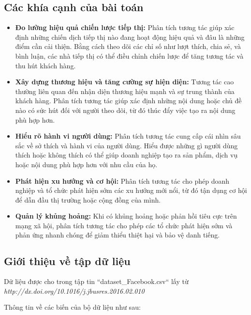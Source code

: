 \subsection*{Các khía cạnh của bài toán}
\begin{itemize}
    \item \textbf{Đo lường hiệu quả chiến lược tiếp thị:} 
    Phân tích tương tác giúp xác định những chiến dịch tiếp thị nào đang hoạt động hiệu quả và đâu là những điểm cần cải thiện. Bằng cách theo dõi các chỉ số như lượt thích, chia sẻ, và bình luận, các nhà tiếp thị có thể điều chỉnh chiến lược để tăng tương tác và thu hút khách hàng.

    \item \textbf{Xây dựng thương hiệu và tăng cường sự hiện diện:} 
    Tương tác cao thường liên quan đến nhận diện thương hiệu mạnh và sự trung thành của khách hàng. Phân tích tương tác giúp xác định những nội dung hoặc chủ đề nào có sức hút đối với người theo dõi, từ đó thúc đẩy việc tạo ra nội dung phù hợp hơn.

    \item \textbf{Hiểu rõ hành vi người dùng:} 
    Phân tích tương tác cung cấp cái nhìn sâu sắc về sở thích và hành vi của người dùng. Hiểu được những gì người dùng thích hoặc không thích có thể giúp doanh nghiệp tạo ra sản phẩm, dịch vụ hoặc nội dung phù hợp hơn với nhu cầu của họ.

    \item \textbf{Phát hiện xu hướng và cơ hội:} 
    Phân tích tương tác cho phép doanh nghiệp và tổ chức phát hiện sớm các xu hướng mới nổi, từ đó tận dụng cơ hội để dẫn đầu thị trường hoặc cộng đồng của mình.

    \item \textbf{Quản lý khủng hoảng:} 
    Khi có khủng hoảng hoặc phản hồi tiêu cực trên mạng xã hội, phân tích tương tác cho phép các tổ chức phát hiện sớm và phản ứng nhanh chóng để giảm thiểu thiệt hại và bảo vệ danh tiếng.
\end{itemize}


\subsection{Giới thiệu về tập dữ liệu}
Dữ liệu được cho trong tập tin ``dataset\_Facebook.csv`` lấy từ \textit{http://dx.doi.org/10.1016/j.jbusres.2016.02.010}

Thông tin về các biến của bộ dữ liệu như sau:

